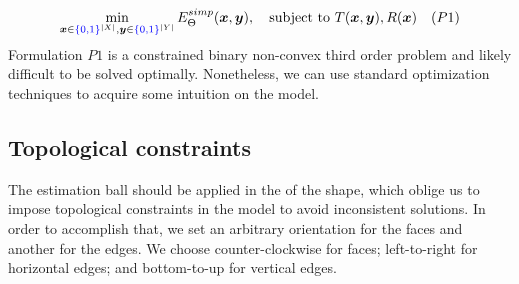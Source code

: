 \begin{align*}
	\min_{\bm{x} \in {\color{blue}{\{0,1\}}}^{|X|}, \bm{y} \in {\color{blue}{\{0,1\}}}^{|Y|}}{E_{\Theta}^{simp}(\bm{x},\bm{y})}, \quad \text{subject to } T(\bm{x},\bm{y}), R(\bm{x}) \quad (P1)
\end{align*}
%
	Formulation $P1$ is a constrained binary non-convex third order problem and likely difficult to be solved optimally. Nonetheless, we can use standard optimization techniques to acquire some intuition on the model. 	
	
\subsection{Topological constraints}
\label{ch5:subsec:topological-constraints}

The estimation ball should be applied in the  of the shape, which oblige us to impose topological constraints in the model to avoid inconsistent solutions. In order to accomplish that, we set an arbitrary orientation for the faces and another for the edges. We choose counter-clockwise for faces; left-to-right for horizontal edges; and bottom-to-up for vertical edges. 


